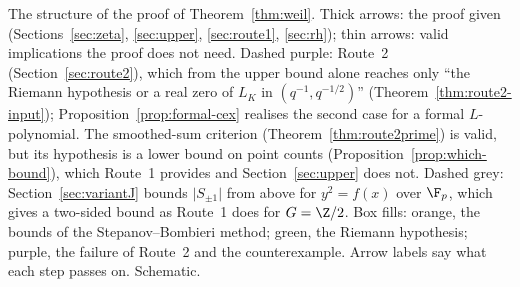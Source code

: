 \caption{The structure of the proof of Theorem~\ref{thm:weil}. Thick
arrows: the proof given (Sections~\ref{sec:zeta}, \ref{sec:upper},
\ref{sec:route1}, \ref{sec:rh}); thin arrows: valid implications the proof
does not need. Dashed purple: Route~2 (Section~\ref{sec:route2}), which
from the upper bound alone reaches only ``the Riemann hypothesis or a real
zero of $L_K$ in $(q^{-1},q^{-1/2})$'' (Theorem~\ref{thm:route2-input});
Proposition~\ref{prop:formal-cex} realises the second case for a formal
$L$-polynomial. The smoothed-sum criterion (Theorem~\ref{thm:route2prime})
is valid, but its hypothesis is a lower bound on point counts
(Proposition~\ref{prop:which-bound}), which Route~1 provides and
Section~\ref{sec:upper} does not. Dashed grey: Section~\ref{sec:variantJ}
bounds $\lvert S_{\pm1}\rvert$ from above for $y^2=f(x)$ over $\F_p$,
which gives a two-sided bound as Route~1 does for $G=\Z/2$. Box fills:
orange, the bounds of the Stepanov--Bombieri method; green, the Riemann
hypothesis; purple, the failure of Route~2 and the counterexample.
Arrow labels say what each step passes on. Schematic.}
\label{fig:proof-map}
